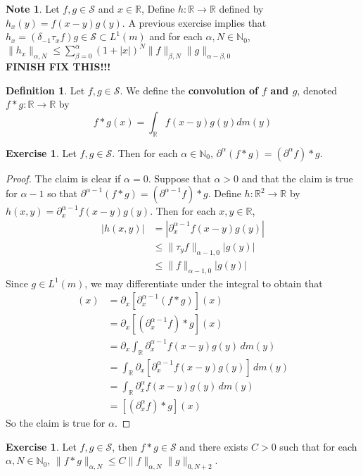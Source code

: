 \documentclass[12pt]{amsart}
\theoremstyle{definition}
\newtheorem{defn}[definition]{Definition}
\newtheorem{note}[definition]{Note}
\newtheorem{ex}[definition]{Exercise}
\newcommand{\p}{\partial}
\newcommand{\al}{\alpha}
\newcommand{\bet}{\beta}
\newcommand{\del}{\delta}
\newcommand{\N}{\mathbb{N}}
\newcommand{\R}{\mathbb{R}}
\newcommand{\MS}{\mathcal{S}}
\newcommand{\dm}{\, d m}
\begin{document}
	\begin{note}
		 Let $f,g \in \MS$ and $x \in \R$, Define $h: \R \rightarrow \R$ defined by $h_x(y) = f(x-y)g(y)$. A previous exercise implies that $h_x = (\del_{-1} \tau_xf)g \in \MS \subset L^1(m)$ and for each $\al, N \in \N_0$, $\|h_x\|_{\al, N} \leq \sum_{\bet=0}^{\al} (1+|x|)^N\|f\|_{\bet, N} \|g\|_{\al - \bet, 0} $ \\
		 \textbf{FINISH FIX THIS!!!}
	\end{note}

	\begin{defn}
		Let $f, g \in \MS$. We define the \textbf{convolution of $f$ and $g$}, denoted $f * g: \R \rightarrow \R$ by $$f*g(x) = \int_{\R} f(x-y)g(y) dm(y)$$
	\end{defn}

	\begin{ex}
		Let $f,g \in \MS$. Then for each $\al \in \N_0$, $\p^{\al}(f*g) = (\p^{\al}f)*g$.
	\end{ex}

	\begin{proof}
			The claim is clear if $\al = 0$. Suppose that $\al > 0$ and that the claim is true for $\al - 1$ so that  $\p^{\al-1}(f*g) = (\p^{\al-1}f)*g$. Define $h: \R^2 \rightarrow \R$ by $h(x,y) = \p_x^{\al-1}f(x-y)g(y)$. Then for each $x,y \in \R$, 
			\begin{align*}
				|h(x,y)| 
				& = |\p_x^{\al-1}f(x-y)g(y)| \\
				& \leq \|\tau_yf\|_{\al-1,0}|g(y)| \\
				& \leq \|f\|_{\al-1,0}|g(y)|
			\end{align*} 
			Since $g \in L^1(m)$, we may differentiate under the integral to obtain that
		\begin{align*}
			[\p_x^{\al}(f*g)](x)
			& = \p_x [\p_x^{\al-1} (f*g)](x) \\
			& = \p_x [(\p_x^{\al-1}f)*g](x) \\
			& = \p_x \int_{\R} \p_x^{\al-1}f(x-y)g(y) \dm(y) \\
			& = \int_{\R} \p_x [\p_x^{\al-1}f(x-y)g(y)] \dm(y) \\
			& = \int_{\R} \p_x^{\al}f(x-y)g(y) \dm(y) \\
			& = [(\p_x^{\al}f)*g](x)
		\end{align*}
		So the claim is true for $\al$.
	\end{proof}

	\begin{ex}
		Let $f, g \in \MS$, then $f *g \in \MS$ and there exists $C >0$ such that for each $\al,N \in \N_0$, $\|f*g\|_{\al,N} \leq C\|f\|_{\al, N} \|g\|_{0, N+2}$. 
	\end{ex}
\end{document}
